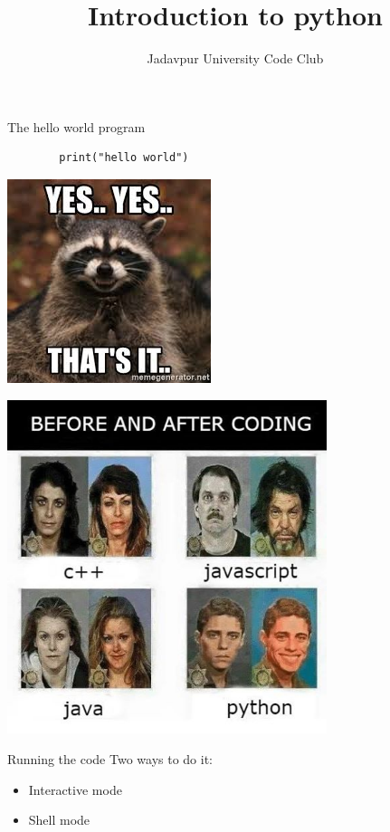 \documentclass{beamer}
\title{Introduction to python}
\author{Jadavpur University Code Club}
\date{}
\begin{document}
\maketitle

\begin{frame}[fragile]{The hello world program}
	\begin{verbatim}
		print("hello world")
	\end{verbatim}
	\pause
	\begin{center}
		\includegraphics[width=.3\textwidth]{./img/images.jpg}
	\end{center}
\end{frame}

\begin{frame}
	\begin{center}
		\includegraphics[width=0.7\textwidth]{./img/main-qimg-e7eaa6e92e42b3df3a851a961fdf7540.jpg}
	\end{center}
\end{frame}

\begin{frame}[fragile]{Running the code}
	\Large{Two ways to do it:}
	\begin{itemize}
		\item Interactive mode
		\item Shell mode
	\end{itemize}
\end{frame}
\end{document}
